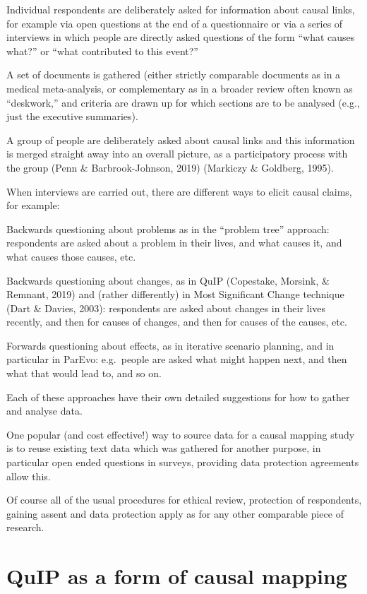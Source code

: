 \documentclass[
]{book}
\begin{document}
Individual respondents are deliberately asked for information about causal links, for example via open questions at the end of a questionnaire or via a series of interviews in which people are directly asked questions of the form ``what causes what?'' or ``what contributed to this event?''

A set of documents is gathered (either strictly comparable documents as in a medical meta-analysis, or complementary as in a broader review often known as ``deskwork,'' and criteria are drawn up for which sections are to be analysed (e.g., just the executive summaries).

A group of people are deliberately asked about causal links and this information is merged straight away into an overall picture, as a participatory process with the group (Penn \& Barbrook-Johnson, 2019) (Markiczy \& Goldberg, 1995).

When interviews are carried out, there are different ways to elicit causal claims, for example:

Backwards questioning about problems as in the ``problem tree'' approach: respondents are asked about a problem in their lives, and what causes it, and what causes those causes, etc.

Backwards questioning about changes, as in QuIP (Copestake, Morsink, \& Remnant, 2019) and (rather differently) in Most Significant Change technique (Dart \& Davies, 2003): respondents are asked about changes in their lives recently, and then for causes of changes, and then for causes of the causes, etc.

Forwards questioning about effects, as in iterative scenario planning, and in particular in ParEvo: e.g.~people are asked what might happen next, and then what that would lead to, and so on.

Each of these approaches have their own detailed suggestions for how to gather and analyse data.

One popular (and cost effective!) way to source data for a causal mapping study is to reuse existing text data which was gathered for another purpose, in particular open ended questions in surveys, providing data protection agreements allow this.

Of course all of the usual procedures for ethical review, protection of respondents, gaining assent and data protection apply as for any other comparable piece of research.

\hypertarget{quip-as-a-form-of-causal-mapping}{%
\section{QuIP as a form of causal mapping}\label{quip-as-a-form-of-causal-mapping}}
\end{document}
